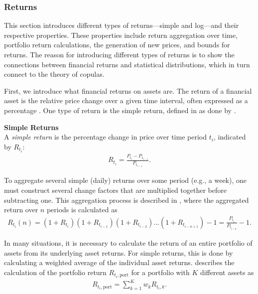 \subsubsection{Returns}
This section introduces different types of returns—simple and log—and their respective properties. These properties include return aggregation over time, portfolio return calculations, the generation of new prices, and bounds for returns. The reason for introducing different types of returns is to show the connections between financial returns and statistical distributions, which in turn connect to the theory of copulas. 

First, we introduce what financial returns on assets are. The return of a financial asset is the relative price change over a given time interval, often expressed as a percentage . One type of return is the simple return, defined in  as done by .

\begin{definition}\label{def:simpleReturns}
    \textbf{Simple Returns} \\
    A \emph{simple return} is the percentage change in price over time period $t_i$, indicated by $R_{t_i}$:
    \begin{align*}
        R_{t_i} = \frac{P_{t_i}-P_{t_{i-1}}}{P_{t_{i-1}}}.
    \end{align*}
\end{definition}

To aggregate several simple (daily) returns over some period (e.g., a week), one must construct several change factors that are multiplied together before subtracting one. This aggregation process is described in , where the aggregated return over $n$ periods is calculated as
\begin{align*}
    R_{t_{i}}(n) = (1+R_{t_{i}})(1+R_{t_{i-1}})(1+R_{t_{i-2}})\dots (1+R_{t_{i-n+1}}) -1 = \frac{P_{t_{i}}}{P_{t_{i-n}}}-1.
\end{align*}

In many situations, it is necessary to calculate the return of an entire portfolio of assets from its underlying asset returns. For simple returns, this is done by calculating a weighted average of the individual asset returns. \citet[p.~3]{Danielsson2011} describes the calculation of the portfolio return $R_{t_i,\mathrm{port}}$ for a portfolio with $K$ different assets as 
\begin{align*}
    R_{t_i,\mathrm{port}} = \sum_{k=1}^K w_k R_{t_i,k}.
\end{align*}

